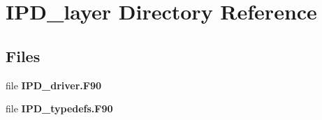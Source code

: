 \section{I\+P\+D\+\_\+layer Directory Reference}
\label{dir_ae3a08e9f564fc9e8b27ae8a77762e0c}
\subsection*{Files}
\begin{DoxyCompactItemize}
\item 
file \textbf{ I\+P\+D\+\_\+driver.\+F90}
\item 
file \textbf{ I\+P\+D\+\_\+typedefs.\+F90}
\end{DoxyCompactItemize}
